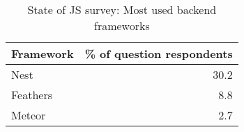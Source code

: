 \begin{table}[ht]
\centering
\caption{State of JS survey: Most used backend frameworks \parencite{mostUsedBackendFrameworks22}}
\label{tab:backendFrameworksRanking}
\begin{tabular}[t]{|l|r|}
\toprule
Framework & \% of question respondents\\
\midrule
Nest & 30.2\\
Feathers & 8.8\\
Meteor & 2.7\\
\bottomrule
\end{tabular}
\end{table}
